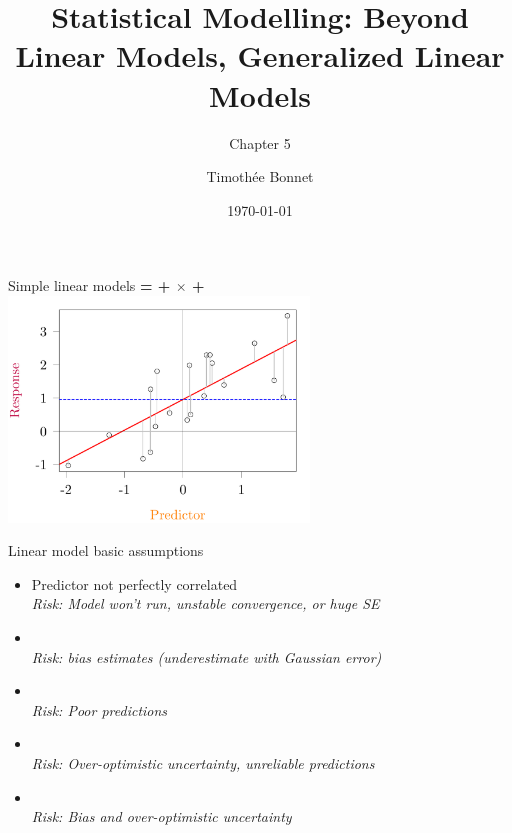 \documentclass{beamer}
\title{Statistical Modelling: Beyond Linear Models, Generalized Linear Models}
\subtitle{Chapter 5}
\author{Timoth\'ee Bonnet}
\date{\today}
\begin{document}



\begin{frame}{}
\maketitle

\end{frame}

\begin{frame}{Simple linear models}
  \textbf{{\color{purple}{Response}} = {\color{blue}{Intercept}} + {\color{red}{Slope}} $\times$ {\color{orange}{Predictor}} + {\color{gray}{Error}}} \\

\centering
\includegraphics[width=0.6\textwidth]{Figures/figure/lmprinc-1}
\end{frame}


\begin{frame}{Linear model basic assumptions}
 \begin{block}{}
     \begin{itemize}
      \item Predictor not perfectly correlated \\ \textit{Risk: Model won't run, unstable convergence, or huge SE}
       \item {\color{red!20!black}{Little error in predictors}}\\ \textit{Risk: bias estimates (underestimate with Gaussian error)}
       \item {\color{red!50!black}{Gaussian error distribution}}\\ \textit{Risk: Poor predictions}
       \item {\color{red!70!black}{Homoscedasticity (constant error variance)}}\\ \textit{Risk: Over-optimistic uncertainty, unreliable predictions}
       \item {\color{red!99!black}{Independence of error}}\\ \textit{Risk: Bias and over-optimistic uncertainty}
     \end{itemize}
 \end{block}
\end{frame}
\end{document}
